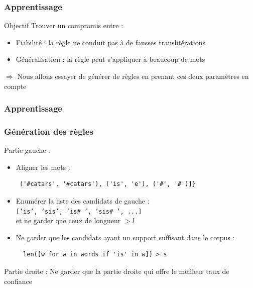 \documentclass{beamer}
\begin{document}
\begin{frame}
	\frametitle{Apprentissage}

	\begin{block}{Objectif}
	Trouver un compromis entre :
		\begin{itemize}
		\item Fiabilité : la règle ne conduit pas à de fausses translitérations
		\item Généralisation : la règle peut s'appliquer à beaucoup de mots
		\end{itemize}			
	\end{block}

	\begin{alertblock}{}
	$\Longrightarrow$ Nous allons essayer de générer de règles en prenant ces deux paramètres en compte
	\end{alertblock}
\end{frame}

\begin{frame}[fragile]
\frametitle{Apprentissage}
\frametitle{Génération des règles}

	\begin{block}{Partie gauche :}
	 	\begin{itemize}
	 	\item Aligner les mots : 
	 	{\scriptsize \begin{verbatim} ('#catars', '#catars'), ('is', 'e'), ('#', '#')]}
	 	 	 \end{verbatim}	}
	 	
	 	\item Enumérer la liste des candidats de gauche :\\
	 		{\scriptsize \texttt{['is', 'sis', 'is\# ', 'sis\# ', ...]}	}  \\
	 		et ne garder que ceux de longueur $> l$
	 		 \vspace{0.6cm}
	 		
	 	\item Ne garder que les candidats ayant un support suffisant dans le corpus :
	 	{\scriptsize \begin{verbatim}  len([w for w in words if 'is' in w]) > s
		\end{verbatim}	}
		
		\end{itemize}
	\end{block}
	
	\begin{block}{Partie droite :}
	Ne garder que la partie droite qui offre le meilleur taux de confiance
	\end{block}		
\end{frame}
\end{document}
